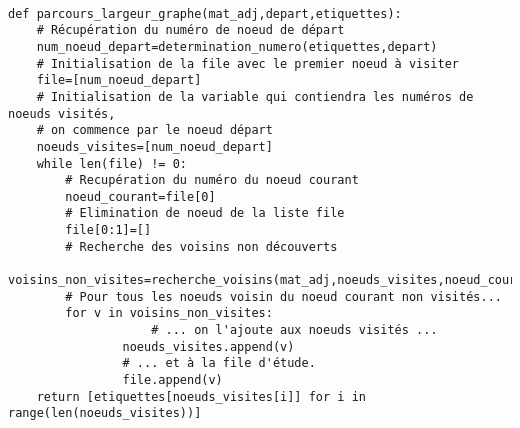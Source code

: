 \ifprof
\begin{corrige}~\\
\begin{lstlisting}
def parcours_largeur_graphe(mat_adj,depart,etiquettes):
    # Récupération du numéro de noeud de départ
    num_noeud_depart=determination_numero(etiquettes,depart)
    # Initialisation de la file avec le premier noeud à visiter 
    file=[num_noeud_depart] 
    # Initialisation de la variable qui contiendra les numéros de noeuds visités, 
    # on commence par le noeud départ
    noeuds_visites=[num_noeud_depart] 
    while len(file) != 0:
    	# Recupération du numéro du noeud courant
        noeud_courant=file[0] 
        # Elimination de noeud de la liste file
        file[0:1]=[] 
        # Recherche des voisins non découverts
        voisins_non_visites=recherche_voisins(mat_adj,noeuds_visites,noeud_courant) 
		# Pour tous les noeuds voisin du noeud courant non visités...        
        for v in voisins_non_visites: 
        			# ... on l'ajoute aux noeuds visités ...
                noeuds_visites.append(v) 
                # ... et à la file d'étude.
                file.append(v) 
    return [etiquettes[noeuds_visites[i]] for i in range(len(noeuds_visites))]

\end{lstlisting}
\end{corrige}
\else
\fi


